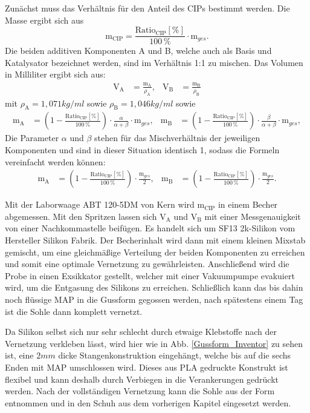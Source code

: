 Zunächst muss das Verhältnis für den Anteil des CIPs bestimmt werden. Die Masse ergibt sich aus
\begin{equation}
\text{m}_{\text{CIP}} = \frac{\text{Ratio}_{\text{CIP}} [\%]}{100\,\%}\cdot\text{m}_{ges}.
\end{equation}
Die beiden additiven Komponenten A und B, welche auch als Basis und Katalysator bezeichnet werden, sind im Verhältnis 1:1 zu mischen. Das Volumen in Milliliter ergibt sich aus:
\begin{align}
\text{V}_\text{A} &= \frac{\text{m}_\text{A}}{\rho_\text{A}} ,& 
\text{V}_\text{B} &= \frac{\text{m}_\text{B}}{\rho_\text{B}}
\end{align}
mit $\rho_\text{A} = 1,071 \unit{kg/ml}$ sowie $\rho_\text{B} = 1,046 \unit{kg/ml}$ sowie
\begin{align}	
\text{m}_\text{A} &= \left( 1- \frac{\text{Ratio}_{\text{CIP}} [\%]}{100\,\%}\right)\cdot
\frac{\alpha}{\alpha + \beta}\cdot \text{m}_{ges} ,&
\text{m}_\text{B} &= \left( 1- \frac{\text{Ratio}_{\text{CIP}} [\%]}{100\,\%}\right)\cdot
\frac{\beta}{\alpha + \beta}\cdot\text{m}_{ges},
\end{align}
Die Parameter $\alpha$ und $\beta$ stehen für das Mischverhältnis der jeweiligen Komponenten und sind in dieser Situation identisch 1, sodass die Formeln vereinfacht werden können:
\begin{align}	
\text{m}_\text{A} &= \left( 1- \frac{\text{Ratio}_{\text{CIP}} [\%]}{100\,\%}\right)\cdot
\frac{\text{m}_{ges}}{2} ,&
\text{m}_\text{B} &= \left( 1- \frac{\text{Ratio}_{\text{CIP}} [\%]}{100\,\%}\right)\cdot
\frac{\text{m}_{ges}}{2}.
\end{align}

Mit der Laborwaage ABT 120-5DM von Kern wird $\text{m}_\text{CIP}$ in einem Becher abgemessen. Mit den Spritzen lassen sich $\text{V}_\text{A}$ und $\text{V}_\text{B}$ mit einer Messgenauigkeit von einer Nachkommastelle beifügen. Es handelt sich um SF13 2k-Silikon vom Hersteller Silikon Fabrik. Der Becherinhalt wird dann mit einem kleinen Mixstab gemischt, um eine gleichmäßige Verteilung der beiden Komponenten zu erreichen und somit eine optimale Vernetzung zu gewährleisten. Anschließend wird die Probe in einen Exsikkator gestellt, welcher mit einer Vakuumpumpe evakuiert wird, um die Entgasung des Silikons zu erreichen. Schließlich kann das bis dahin noch flüssige MAP in die Gussform gegossen werden, nach spätestens einem Tag ist die Sohle dann komplett vernetzt. 

Da Silikon selbst sich nur sehr schlecht durch etwaige Klebstoffe nach der Vernetzung verkleben lässt, wird hier wie in Abb. \ref{Gussform_Inventor} zu sehen ist, eine $2\unit{mm}$ dicke Stangenkonstruktion eingehängt, welche bis auf die sechs Enden mit MAP umschlossen wird. Dieses aus PLA gedruckte Konstrukt ist flexibel und kann deshalb durch Verbiegen in die Verankerungen gedrückt werden. Nach der vollständigen Vernetzung kann die Sohle aus der Form entnommen und in den Schuh aus dem vorherigen Kapitel eingesetzt werden. 

